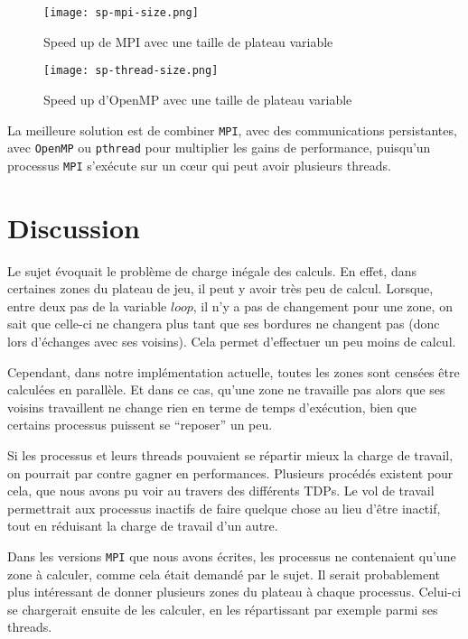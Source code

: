\begin{figure}[H]
\centering
\texttt{[image: sp-mpi-size.png]}
\caption{Speed up de MPI avec une taille de plateau variable}
\label{sp-mpi-size}
\end{figure}
\begin{figure}[H]
\centering
\texttt{[image: sp-thread-size.png]}
\caption{Speed up d'OpenMP avec une taille de plateau variable}
\label{sp-thread-size}
\end{figure}

La meilleure solution est de combiner \texttt{MPI}, avec des communications persistantes, avec \texttt{OpenMP} ou \texttt{pthread} pour multiplier les gains de performance, puisqu'un processus \texttt{MPI} s'exécute sur un c\oe ur qui peut avoir plusieurs threads.


\section{Discussion} %
\label{sec:discussion}

Le sujet évoquait le problème de charge inégale des calculs. En effet, dans certaines zones du plateau de jeu, il peut y avoir très peu de calcul. Lorsque, entre deux pas de la variable $loop$, il n'y a pas de changement pour une zone, on sait que celle-ci ne changera plus tant que ses bordures ne changent pas (donc lors d'échanges avec ses voisins). Cela permet d'effectuer un peu moins de calcul.

Cependant, dans notre implémentation actuelle, toutes les zones sont censées être calculées en parallèle. Et dans ce cas, qu'une zone ne travaille pas alors que ses voisins travaillent ne change rien en terme de temps d'exécution, bien que certains processus puissent se ``reposer'' un peu. 

Si les processus et leurs threads pouvaient se répartir mieux la charge de travail, on pourrait par contre gagner en performances. Plusieurs procédés existent pour cela, que nous avons pu voir au travers des différents TDPs. Le vol de travail permettrait aux processus inactifs de faire quelque chose au lieu d'être inactif, tout en réduisant la charge de travail d'un autre. 

Dans les versions \texttt{MPI} que nous avons écrites, les processus ne contenaient qu'une zone à calculer, comme cela était demandé par le sujet. Il serait probablement plus intéressant de donner plusieurs zones du plateau à chaque processus. Celui-ci se chargerait ensuite de les calculer, en les répartissant par exemple parmi ses threads. 


